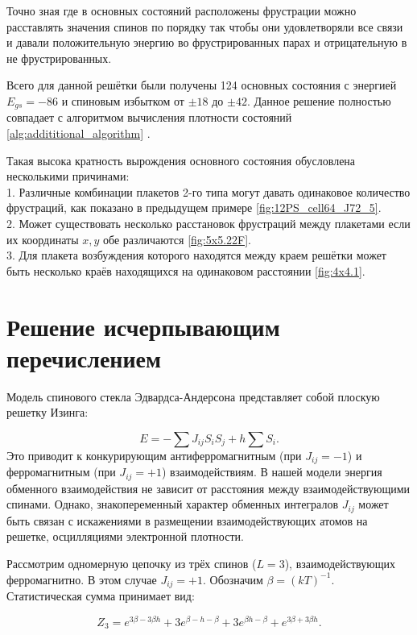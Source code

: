 \documentclass[utf8, babel, sor, jor, amsmath, amssymb, reprint]{elsarticle} %
\begin{document}
Точно зная где в основных состояний расположены фрустрации можно расставлять значения спинов по порядку так чтобы они удовлетворяли все связи и давали положительную энергию во фрустрированных парах и отрицательную в не фрустрированных. 

Всего для данной решётки были получены 124 основных состояния с энергией $E_{gs}=-86$ и спиновым избытком от $\pm 18$ до $\pm 42$. Данное решение полностью совпадает с алгоритмом вычисления плотности состояний \ref{alg:addititional_algorithm} .

Такая высока кратность вырождения основного состояния обусловлена несколькими причинами:\\
1. Различные комбинации плакетов 2-го типа могут давать одинаковое количество фрустраций, как показано в предыдущем примере \ref{fig:12PS_cell64_J72_5}.\\
2. Может существовать несколько расстановок фрустраций между плакетами если их координаты $x,y$ обе различаются \ref{fig:5x5.22F}.\\
3. Для плакета возбуждения которого находятся между краем решётки может быть несколько краёв находящихся на одинаковом расстоянии \ref{fig:4x4.1}.\\


\section{Решение исчерпывающим перечислением}

Модель спинового стекла Эдвардса-Андерсона представляет собой плоскую решетку Изинга:

\begin{equation}
	E = -\sum J_{ij} S_i S_j + h \sum S_i.
	\label{eq:ising_energy}
\end{equation}
Это приводит к конкурирующим антиферромагнитным (при $J_{ij}=-1$) и ферромагнитным (при $J_{ij}=+1$) взаимодействиям. В нашей модели энергия обменного взаимодействия не зависит от расстояния между взаимодействующими спинами. Однако, знакопеременный характер обменных интегралов $J_{ij}$ может быть связан с искажениями в размещении взаимодействующих атомов на решетке, осцилляциями электронной плотности.

Рассмотрим одномерную цепочку из трёх спинов ($L=3$), взаимодействующих ферромагнитно.  В этом случае $J_{ij}=+1$.  Обозначим $\beta = (kT)^{-1}$.  Статистическая сумма принимает вид:

\begin{equation}
	Z_3 = e^{3\beta - 3\beta h} + 3e^{\beta - h - \beta} + 3e^{\beta h - \beta} + e^{3\beta + 3\beta h}.
	\label{eq:stat_3}
\end{equation}
\end{document}
